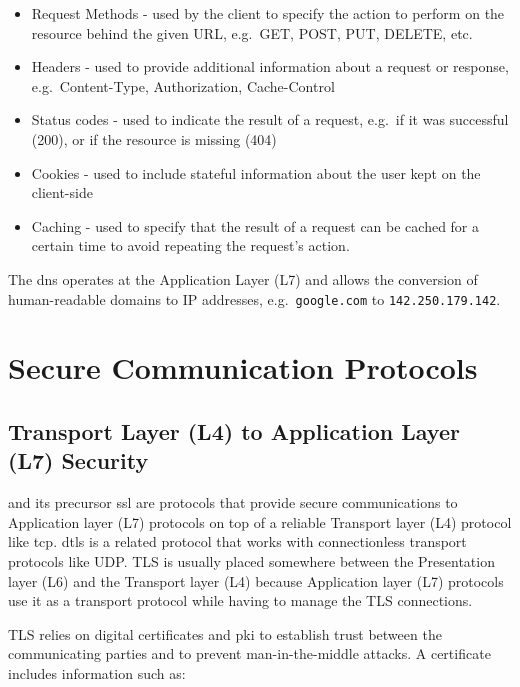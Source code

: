 \begin{itemize}
\tightlist
\item
  Request Methods - used by the client to specify the action to perform
  on the resource behind the given URL, e.g.~GET, POST, PUT, DELETE,
  etc.
\item
  Headers - used to provide additional information about a request or
  response, e.g.~Content-Type, Authorization, Cache-Control
\item
  Status codes - used to indicate the result of a request, e.g.~if it
  was successful (200), or if the resource is missing (404)
\item
  Cookies - used to include stateful information about the user kept on
  the client-side
\item
  Caching - used to specify that the result of a request can be cached
  for a certain time to avoid repeating the request's action.
\end{itemize}

The \gls{dns} operates at the Application Layer (L7) and allows the
conversion of human-readable domains to IP addresses,
e.g.~\texttt{google.com} to \texttt{142.250.179.142}.

\hypertarget{secure-communication-protocols}{%
\section{Secure Communication
Protocols}\label{secure-communication-protocols}}

\hypertarget{transport-layer-l4-to-application-layer-l7-security}{%
\subsection{Transport Layer (L4) to Application Layer (L7)
Security}\label{transport-layer-l4-to-application-layer-l7-security}}

 \autocite{tlsRFC} and its precursor \gls{ssl} are
protocols that provide secure communications to Application layer (L7)
protocols on top of a reliable Transport layer (L4) protocol like
\gls{tcp}. \gls{dtls} is a related protocol that works with
connectionless transport protocols like UDP. TLS is usually placed
somewhere between the Presentation layer (L6) and the Transport layer
(L4) because Application layer (L7) protocols use it as a transport
protocol while having to manage the TLS connections.

TLS relies on digital certificates and \gls{pki} to establish trust
between the communicating parties and to prevent man-in-the-middle
attacks. A certificate includes information such as:

